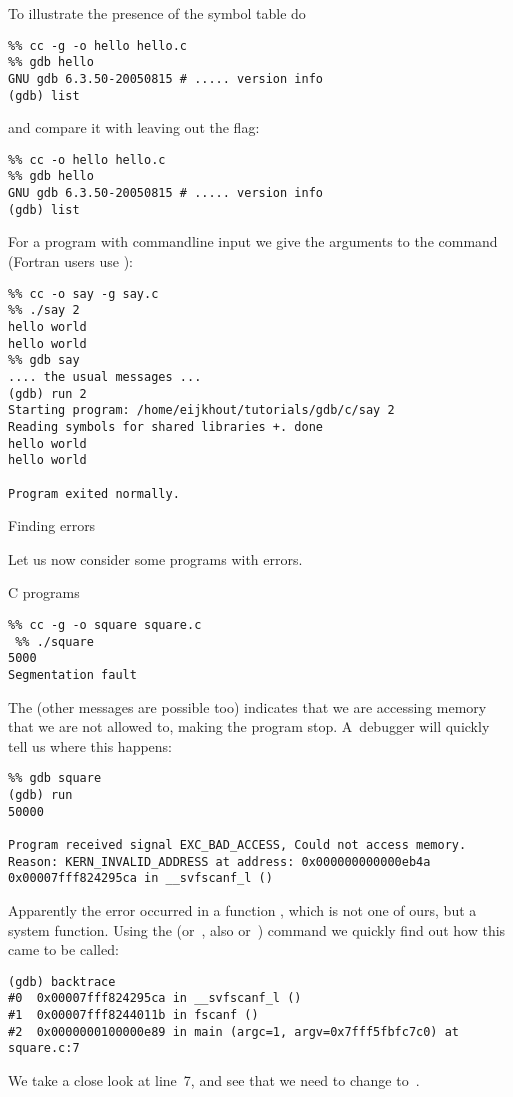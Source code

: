 To illustrate the presence of the symbol table do
\begin{verbatim}
%% cc -g -o hello hello.c
%% gdb hello
GNU gdb 6.3.50-20050815 # ..... version info
(gdb) list
\end{verbatim}
and compare it with leaving out the  flag:
\begin{verbatim}
%% cc -o hello hello.c
%% gdb hello
GNU gdb 6.3.50-20050815 # ..... version info
(gdb) list
\end{verbatim}

For a program with commandline input we give the arguments to the
 command (Fortran users use ):
\begin{verbatim}
%% cc -o say -g say.c
%% ./say 2
hello world
hello world
%% gdb say
.... the usual messages ...
(gdb) run 2
Starting program: /home/eijkhout/tutorials/gdb/c/say 2
Reading symbols for shared libraries +. done
hello world
hello world

Program exited normally.
\end{verbatim}

 {Finding errors}

Let us now consider some programs with errors.

 {C programs}

\begin{verbatim}
%% cc -g -o square square.c
 %% ./square
5000
Segmentation fault
\end{verbatim}
The  (other messages are possible too) 
indicates that we are accessing
memory that we are not allowed to, making the program stop.
A~debugger will quickly tell us where this happens:
\begin{verbatim}
%% gdb square
(gdb) run
50000

Program received signal EXC_BAD_ACCESS, Could not access memory.
Reason: KERN_INVALID_ADDRESS at address: 0x000000000000eb4a
0x00007fff824295ca in __svfscanf_l ()
\end{verbatim}
Apparently the error occurred in a function , which is
not one of ours, but a system function. Using the 
(or~, also  or~) command we quickly find out how
this came to be called:
\begin{verbatim}
(gdb) backtrace
#0  0x00007fff824295ca in __svfscanf_l ()
#1  0x00007fff8244011b in fscanf ()
#2  0x0000000100000e89 in main (argc=1, argv=0x7fff5fbfc7c0) at square.c:7
\end{verbatim}
We take a close look at line~7, and see that we need to
change  to~.

